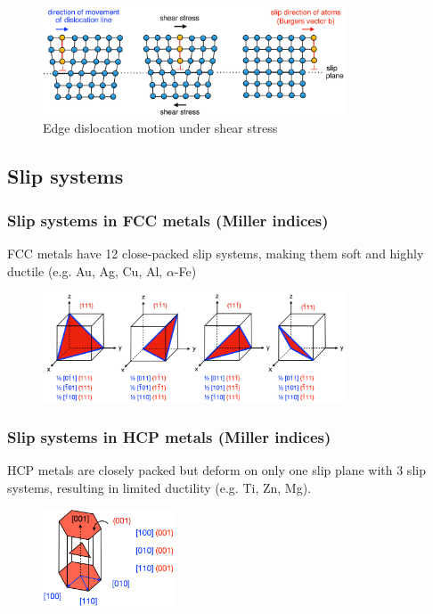 \documentclass{article}
\begin{document}
\begin{figure}[ht!]
  \centering
  \includegraphics[width=0.8\textwidth]{media/simplified_dislocation_slip_model.png}
  \caption*{Edge dislocation motion under shear stress}
\end{figure}

\subsection{Slip systems}
\subsubsection{Slip systems in FCC metals (Miller indices)}
FCC metals have 12 close-packed slip systems, making them soft and highly ductile (e.g. Au, Ag, Cu, Al, $\alpha$-Fe)
\begin{figure}[ht!]
  \centering
  \includegraphics[width=0.8\textwidth]{media/FBB_miller.png}
\end{figure}

\subsubsection{Slip systems in HCP metals (Miller indices)}
HCP metals are closely packed but deform on only one slip plane with 3 slip systems, resulting in limited ductility
(e.g. Ti, Zn, Mg). 
\begin{figure}[ht!]
  \centering
  \includegraphics[width=0.35\textwidth]{media/HCP_miller.png}
\end{figure}
\end{document}
